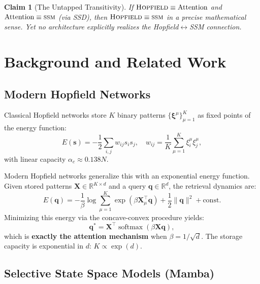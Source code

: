 \documentclass[11pt,a4paper]{article}
\numberwithin{equation}{section}
\newtheorem{claim}{Claim}[section]
\newcommand{\R}{\mathbb{R}}
\newcommand{\softmax}{\operatorname{softmax}}
\newcommand{\ssm}{\textsc{ssm}}
\newcommand{\hopfield}{\textsc{Hopfield}}
\begin{document}
\begin{claim}[The Untapped Transitivity]
If $\hopfield \equiv \text{Attention}$ and $\text{Attention} \equiv \ssm$
(via SSD), then $\hopfield \equiv \ssm$ in a precise mathematical sense.
Yet no architecture explicitly realizes the Hopfield$\leftrightarrow$SSM connection.
\end{claim}

\section{Background and Related Work}
\label{sec:background}

\subsection{Modern Hopfield Networks}

Classical Hopfield networks \cite{hopfield1982neural} store $K$ binary patterns
$\{\bm{\xi}^\mu\}_{\mu=1}^K$ as fixed points of the energy function:
\begin{equation}
    E(\bm{s}) = -\frac12 \sum_{i,j} w_{ij} s_i s_j, \quad
    w_{ij} = \frac1K \sum_{\mu=1}^K \xi_i^\mu \xi_j^\mu,
\end{equation}
with linear capacity $\alpha_c \approx 0.138N$.

Modern Hopfield networks \cite{ramsauer2021hopfield} generalize this with an
exponential energy function. Given stored patterns $\bm{X} \in \R^{K \times d}$ and
a query $\bm{q} \in \R^d$, the retrieval dynamics are:
\begin{equation}
    E(\bm{q}) = -\frac1\beta \log\sum_{\mu=1}^K \exp(\beta \bm{X}_\mu^\top \bm{q})
    + \frac12 \|\bm{q}\|^2 + \text{const}.
\end{equation}
Minimizing this energy via the concave-convex procedure yields:
\begin{equation}
    \bm{q}^* = \bm{X}^\top \softmax(\beta \bm{X} \bm{q}),
    \label{eq:hopfield_update}
\end{equation}
which is \textbf{exactly the attention mechanism} when $\beta = 1/\sqrt{d}$.
The storage capacity is exponential in $d$: $K \propto \exp(d)$.

\subsection{Selective State Space Models (Mamba)}
\end{document}
